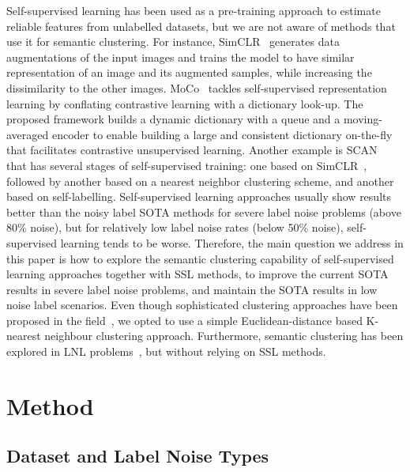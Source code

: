 \documentclass[review]{elsarticle}
\theoremstyle{plain}
\begin{document}
Self-supervised learning has been used as a pre-training approach to estimate reliable features from  unlabelled datasets, but we are not aware of methods that use it for semantic clustering.  For instance, SimCLR~\citep{SimCLR} generates data augmentations of the input images and trains the model to have similar representation of an image and its augmented samples, while increasing the dissimilarity to the other images. 
MoCo~\citep{MoCo, MoCoV2} tackles self-supervised representation learning by conflating contrastive learning with a dictionary look-up. The proposed framework builds a dynamic dictionary with a queue and a moving-averaged encoder to enable building a large and consistent dictionary on-the-fly that facilitates contrastive unsupervised learning.
Another example is SCAN~\citep{SCAN} that
has several stages of self-supervised training: one based on SimCLR~\citep{SimCLR}, followed by another based on a nearest neighbor clustering scheme, and another based on self-labelling.
Self-supervised learning approaches usually show results better than the noisy label SOTA methods for severe label noise problems (above 80\% noise), but for relatively low label noise rates (below 50\% noise), self-supervised learning tends to be worse.
Therefore, the main question we address in this paper is how to explore the semantic clustering capability of self-supervised learning approaches together with SSL methods, to improve the current SOTA results in severe label noise problems, and maintain the SOTA results in low noise label scenarios. 
Even though sophisticated clustering approaches have been proposed in the field~\citep{wang2018detecting,wang2020robust,shukla2020semi,han2020unsupervised}, we opted to use a simple Euclidean-distance based K-nearest neighbour clustering approach.
Furthermore, semantic clustering has been explored in LNL problems~\citep{rebbapragada2007class,chiaroni2019hallucinating}, but without relying on SSL methods.

\section{Method}
\label{sec:method}


\subsection{Dataset and Label Noise Types}
\label{sec:dataset_labelnoisetype}
\end{document}
